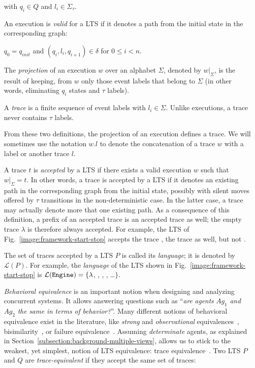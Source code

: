 \noindent with $q_i \in Q$ and $l_i \in \Sigma_{\tau}$. 

An execution is \emph{valid} for a LTS if it denotes a path from the initial state in the corresponding graph:

\begin{center}
$q_0 = q_{init}$ and $(q_i,l_i,q_{i+1}) \in \delta$ for $0 \leq i < n$. 
\end{center}

The \emph{projection} of an execution $w$ over an alphabet $\Sigma$, denoted by $w|_{\Sigma}$, is the result of keeping, from $w$ only those event labels that belong to $\Sigma$ (in other words, eliminating $q_i$ states and $\tau$ labels).

A \emph{trace} is a finite sequence of event labels  with $l_i \in \Sigma$. Unlike executions, a trace never contains $\tau$ labels. 

From these two definitions, the projection of an execution defines a trace. We will sometimes use the notation $w.l$ to denote the concatenation of a trace $w$ with a label or another trace $l$.

A trace $t$ is \emph{accepted} by a LTS if there exists a valid execution $w$ such that $w|_{\Sigma} = t$. In other words, a trace is accepted by a LTS if it denotes an existing path in the corresponding graph from the initial state, possibly with silent moves offered by $\tau$ transitions in the non-deterministic case. In the latter case, a trace may actually denote more that one existing path. As a consequence of this definition, a prefix of an accepted trace is an accepted trace as well; the empty trace $\lambda$ is therefore always accepted. For example, the LTS of Fig.~\ref{image:framework-start-stop} accepts the trace , the trace  as well, but not . 

The set of traces accepted by a LTS $P$ is called its \emph{language}; it is denoted by $\mathcal{L}(P)$. For example, the  \emph{language} of the LTS shown in Fig.~\ref{image:framework-start-stop} is $\mathcal{L}(\texttt{Engine})=\{\lambda$, , , , \ldots $\}$. 

\emph{Behavioral equivalence} is an important notion when designing and analyzing concurrent systems. It allows answering questions such as ``\emph{are agents $Ag_1$ and $Ag_2$ the same in terms of behavior?}''. Many different notions of behavioral equivalence exist in the literature, like \emph{strong} and \emph{observational}  equivalences~\cite{Milner:1989}, bisimilarity~\cite{Park:1981}, or failure equivalence~\cite{Hoare:1985}. Assuming \emph{determinate} agents, as explained in Section~\ref{subsection:background-multiple-views}, allows us to stick to the weakest, yet simplest, notion of LTS equivalence: trace equivalence~\cite{Hoare:1985, Engelfriet:1985}. Two LTS $P$ and $Q$ are \emph{trace-equivalent} if they accept the same set of traces:

